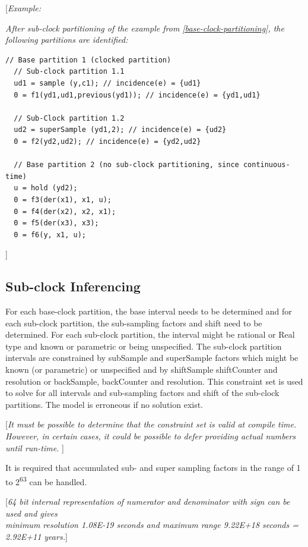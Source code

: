 \documentclass[10pt,a4paper]{report}
\def\doublelabel#1{\label{#1}}
\begin{document}
{[}\emph{Example:}

\emph{After sub-clock partitioning of the example from \ref{base-clock-partitioning}, the following partitions are identified:}
\begin{lstlisting}[language=modelica]
  // Base partition 1 (clocked partition)
  // Sub-clock partition 1.1
  ud1 = sample (y,c1); // incidence(e) = {ud1}
  0 = f1(yd1,ud1,previous(yd1)); // incidence(e) = {yd1,ud1}

  // Sub-Clock partition 1.2
  ud2 = superSample (yd1,2); // incidence(e) = {ud2}
  0 = f2(yd2,ud2); // incidence(e) = {yd2,ud2}

  // Base partition 2 (no sub-clock partitioning, since continuous-time)
  u = hold (yd2);
  0 = f3(der(x1), x1, u);
  0 = f4(der(x2), x2, x1);
  0 = f5(der(x3), x3);
  0 = f6(y, x1, u);
\end{lstlisting}
{]}

\subsection{Sub-clock Inferencing}\doublelabel{sub-clock-inferencing}

For each base-clock partition, the base interval needs to be determined
and for each sub-clock partition, the sub-sampling factors and shift
need to be determined. For each sub-clock partition, the interval might
be rational or Real type and known or parametric or being unspecified.
The sub-clock partition intervals are constrained by subSample and
superSample factors which might be known (or parametric) or unspecified
and by shiftSample shiftCounter and resolution or backSample,
backCounter and resolution. This constraint set is used to solve for all
intervals and sub-sampling factors and shift of the sub-clock
partitions. The model is erroneous if no solution exist.

{[}\emph{It must be possible to determine that the constraint set is
valid at compile time. However, in certain cases, it could be possible
to defer providing actual numbers until run-time.} {]}

It is required that accumulated sub- and super sampling factors in the
range of 1 to 2\textsuperscript{63} can be handled.

{[}\emph{64 bit internal representation of numerator and denominator
with sign can be used and gives\\
minimum resolution 1.08E-19 seconds and maximum range 9.22E+18 seconds =
2.92E+11 years.}{]}
\end{document}
